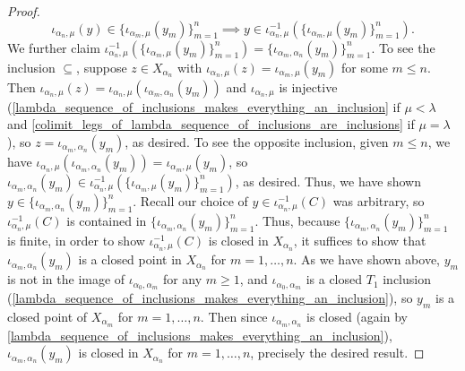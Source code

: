 \documentclass{amsart}
\theoremstyle{plain}
\theoremstyle{definition}
\newcommand{\sseq}{\subseteq}
\newcommand{\0}{\mathbf{0}}
\renewcommand{\(}{\left(}
\renewcommand{\)}{\right)}
\begin{document}
\begin{proof}
  \[\iota_{\alpha_n,\mu}(y)\in\{\iota_{\alpha_m,\mu}(y_m)\}_{m=1}^n\implies y\in\iota_{\alpha_n,\mu}^{-1}(\{\iota_{\alpha_m,\mu}(y_m)\}_{m=1}^n).\]
  We further claim $\iota_{\alpha_n,\mu}^{-1}(\{\iota_{\alpha_m,\mu}(y_m)\}_{m=1}^n)=\{\iota_{\alpha_m,\alpha_n}(y_m)\}_{m=1}^n$. To see the inclusion $\sseq$, suppose $z\in X_{\alpha_n}$ with $\iota_{\alpha_n,\mu}(z)=\iota_{\alpha_m,\mu}(y_m)$ for some $m\leq n$. Then $\iota_{\alpha_n,\mu}(z)=\iota_{\alpha_n,\mu}(\iota_{\alpha_m,\alpha_n}(y_m))$ and $\iota_{\alpha_n,\mu}$ is injective (\autoref{lambda_sequence_of_inclusions_makes_everything_an_inclusion} if $\mu<\lambda$ and \autoref{colimit_legs_of_lambda_sequence_of_inclusions_are_inclusions} if $\mu=\lambda$), so $z=\iota_{\alpha_m,\alpha_n}(y_m)$, as desired. To see the opposite inclusion, given $m\leq n$, we have $\iota_{\alpha_n,\mu}(\iota_{\alpha_m,\alpha_n}(y_m))=\iota_{\alpha_m,\mu}(y_m)$, so $\iota_{\alpha_m,\alpha_n}(y_m)\in \iota_{\alpha_n,\mu}^{-1}(\{\iota_{\alpha_m,\mu}(y_m)\}_{m=1}^n)$, as desired. Thus, we have shown $y\in\{\iota_{\alpha_m,\alpha_n}(y_m)\}_{m=1}^n$. Recall our choice of $y\in\iota_{\alpha_n,\mu}^{-1}(C)$ was arbitrary, so $\iota_{\alpha_n,\mu}^{-1}(C)$ is contained in $\{\iota_{\alpha_m,\alpha_n}(y_m)\}_{m=1}^n$. Thus, because $\{\iota_{\alpha_m,\alpha_n}(y_m)\}_{m=1}^n$ is finite, in order to show $\iota_{\alpha_n,\mu}^{-1}(C)$ is closed in $X_{\alpha_n}$, it suffices to show that $\iota_{\alpha_m,\alpha_n}(y_m)$ is a closed point in $X_{\alpha_n}$ for $m=1,\ldots,n$. As we have shown above, $y_m$ is not in the image of $\iota_{\alpha_0,\alpha_m}$ for any $m\geq1$, and $\iota_{\alpha_0,\alpha_m}$ is a closed $T_1$ inclusion (\autoref{lambda_sequence_of_inclusions_makes_everything_an_inclusion}), so $y_m$ is a closed point of $X_{\alpha_m}$ for $m=1,\ldots,n$. Then since $\iota_{\alpha_m,\alpha_n}$ is closed (again by \autoref{lambda_sequence_of_inclusions_makes_everything_an_inclusion}), $\iota_{\alpha_m,\alpha_n}(y_m)$ is closed in $X_{\alpha_n}$ for $m=1,\ldots,n$, precisely the desired result.


\end{proof}
\end{document}

